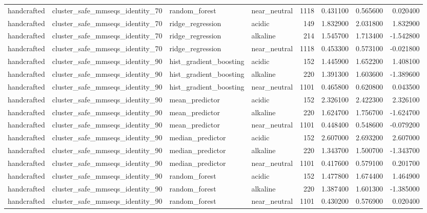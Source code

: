 \begin{longtable}{llllrrrr}
handcrafted & cluster\_safe\_mmseqs\_identity\_70 & random\_forest & near\_neutral & 1118 & 0.431100 & 0.565600 & 0.020400 \\
handcrafted & cluster\_safe\_mmseqs\_identity\_70 & ridge\_regression & acidic & 149 & 1.832900 & 2.031800 & 1.832900 \\
handcrafted & cluster\_safe\_mmseqs\_identity\_70 & ridge\_regression & alkaline & 214 & 1.545700 & 1.713400 & -1.542800 \\
handcrafted & cluster\_safe\_mmseqs\_identity\_70 & ridge\_regression & near\_neutral & 1118 & 0.453300 & 0.573100 & -0.021800 \\
handcrafted & cluster\_safe\_mmseqs\_identity\_90 & hist\_gradient\_boosting & acidic & 152 & 1.445900 & 1.652200 & 1.408100 \\
handcrafted & cluster\_safe\_mmseqs\_identity\_90 & hist\_gradient\_boosting & alkaline & 220 & 1.391300 & 1.603600 & -1.389600 \\
handcrafted & cluster\_safe\_mmseqs\_identity\_90 & hist\_gradient\_boosting & near\_neutral & 1101 & 0.465800 & 0.620800 & 0.043500 \\
handcrafted & cluster\_safe\_mmseqs\_identity\_90 & mean\_predictor & acidic & 152 & 2.326100 & 2.422300 & 2.326100 \\
handcrafted & cluster\_safe\_mmseqs\_identity\_90 & mean\_predictor & alkaline & 220 & 1.624700 & 1.756700 & -1.624700 \\
handcrafted & cluster\_safe\_mmseqs\_identity\_90 & mean\_predictor & near\_neutral & 1101 & 0.448400 & 0.548600 & -0.079200 \\
handcrafted & cluster\_safe\_mmseqs\_identity\_90 & median\_predictor & acidic & 152 & 2.607000 & 2.693200 & 2.607000 \\
handcrafted & cluster\_safe\_mmseqs\_identity\_90 & median\_predictor & alkaline & 220 & 1.343700 & 1.500700 & -1.343700 \\
handcrafted & cluster\_safe\_mmseqs\_identity\_90 & median\_predictor & near\_neutral & 1101 & 0.417600 & 0.579100 & 0.201700 \\
handcrafted & cluster\_safe\_mmseqs\_identity\_90 & random\_forest & acidic & 152 & 1.477800 & 1.674400 & 1.464900 \\
handcrafted & cluster\_safe\_mmseqs\_identity\_90 & random\_forest & alkaline & 220 & 1.387400 & 1.601300 & -1.385000 \\
handcrafted & cluster\_safe\_mmseqs\_identity\_90 & random\_forest & near\_neutral & 1101 & 0.430200 & 0.576900 & 0.020400 \\

\end{longtable}
